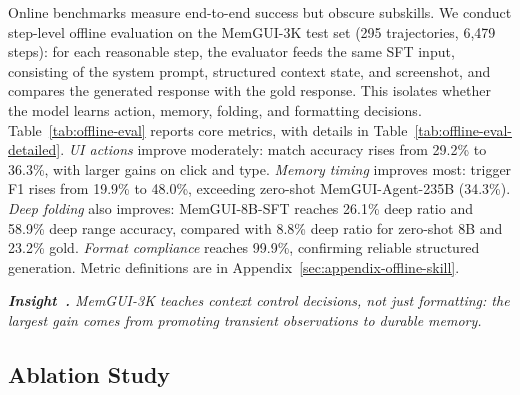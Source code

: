 \documentclass{llmxive}
\providecommand{\insight}[1]{\refstepcounter{insight}\par\noindent\textit{\textbf{Insight~\theinsight.} #1}\par}
\providecommand{\ourmethod}{MemGUI-Agent\xspace}
\begin{document}
Online benchmarks measure end-to-end success but obscure subskills. We conduct step-level offline evaluation on the MemGUI-3K test set (295 trajectories, 6{,}479 steps): for each reasonable step, the evaluator feeds the same SFT input, consisting of the system prompt, structured context state, and screenshot, and compares the generated response with the gold response. This isolates whether the model learns action, memory, folding, and formatting decisions. Table~\ref{tab:offline-eval} reports core metrics, with details in Table~\ref{tab:offline-eval-detailed}. \emph{UI actions} improve moderately: match accuracy rises from 29.2\% to 36.3\%, with larger gains on click and type. \emph{Memory timing} improves most: trigger F1 rises from 19.9\% to 48.0\%, exceeding zero-shot \ourmethod-235B (34.3\%). \emph{Deep folding} also improves: MemGUI-8B-SFT reaches 26.1\% deep ratio and 58.9\% deep range accuracy, compared with 8.8\% deep ratio for zero-shot 8B and 23.2\% gold. \emph{Format compliance} reaches 99.9\%, confirming reliable structured generation. Metric definitions are in Appendix~\ref{sec:appendix-offline-skill}.

\insight{MemGUI-3K teaches context control decisions, not just formatting: the largest gain comes from promoting transient observations to durable memory.}

\subsection{Ablation Study}
\label{sec:ablation}
\vspace{-0.35em}
\end{document}
